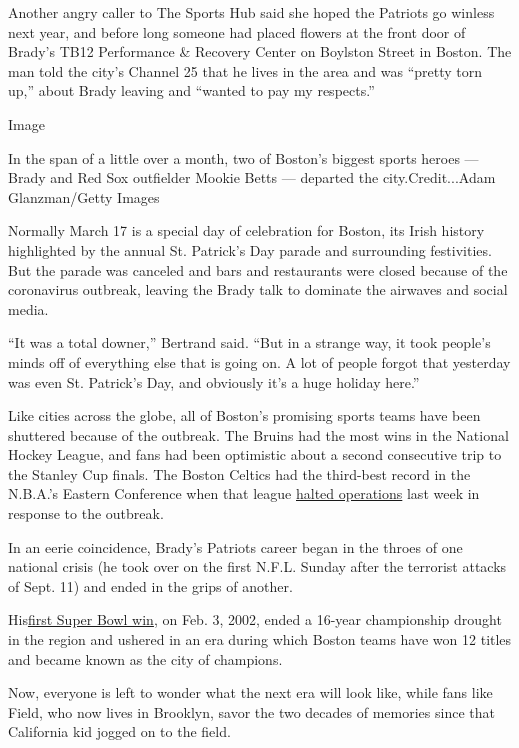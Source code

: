 Another angry caller to The Sports Hub said she hoped the Patriots go
winless next year, and before long someone had placed flowers at the
front door of Brady's TB12 Performance \& Recovery Center on Boylston
Street in Boston. The man told the city's Channel 25 that he lives in
the area and was ``pretty torn up,'' about Brady leaving and ``wanted to
pay my respects.''

Image

In the span of a little over a month, two of Boston's biggest sports
heroes --- Brady and Red Sox outfielder Mookie Betts --- departed the
city.Credit...Adam Glanzman/Getty Images

Normally March 17 is a special day of celebration for Boston, its Irish
history highlighted by the annual St. Patrick's Day parade and
surrounding festivities. But the parade was canceled and bars and
restaurants were closed because of the coronavirus outbreak, leaving the
Brady talk to dominate the airwaves and social media.

``It was a total downer,'' Bertrand said. ``But in a strange way, it
took people's minds off of everything else that is going on. A lot of
people forgot that yesterday was even St. Patrick's Day, and obviously
it's a huge holiday here.''

Like cities across the globe, all of Boston's promising sports teams
have been shuttered because of the outbreak. The Bruins had the most
wins in the National Hockey League, and fans had been optimistic about a
second consecutive trip to the Stanley Cup finals. The Boston Celtics
had the third-best record in the N.B.A.'s Eastern Conference when that
league
\href{https://www.nytimes3xbfgragh.onion/2020/03/11/sports/basketball/nba-season-suspended-coronavirus.html}{halted
operations} last week in response to the outbreak.

In an eerie coincidence, Brady's Patriots career began in the throes of
one national crisis (he took over on the first N.F.L. Sunday after the
terrorist attacks of Sept. 11) and ended in the grips of another.

His\href{https://www.cnn.com/2019/01/24/sport/rams-patriots-2002-super-bowl-xxxvi/index.html}{first
Super Bowl win}, on Feb. 3, 2002, ended a 16-year championship drought
in the region and ushered in an era during which Boston teams have won
12 titles and became known as the city of champions.

Now, everyone is left to wonder what the next era will look like, while
fans like Field, who now lives in Brooklyn, savor the two decades of
memories since that California kid jogged on to the field.

